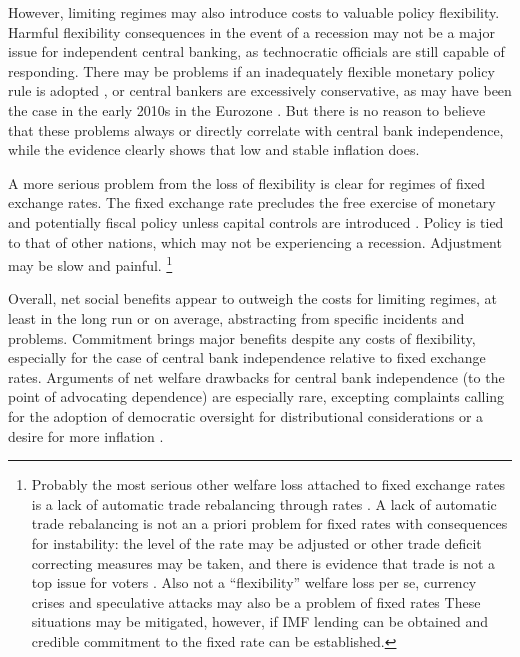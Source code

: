 \documentclass{article}
\begin{document}
    However, limiting regimes may also introduce costs to valuable policy flexibility. Harmful flexibility consequences in the event of a recession may not be a major issue for independent central banking, as technocratic officials are still capable of responding. There may be problems if an inadequately flexible monetary policy rule is adopted \citep{bernanke_taylor_2015}, or central bankers are excessively conservative, as may have been the case in the early 2010s in the Eurozone \citep{krugman_opinion_2011}. But there is no reason to believe that these problems always or directly correlate with central bank independence, while the evidence clearly shows that low and stable inflation does.
    
    A more serious problem from the loss of flexibility is clear for regimes of fixed exchange rates. The fixed exchange rate precludes the free exercise of monetary and potentially fiscal policy unless capital controls are introduced \citep{fleming_domestic_1962, mundell_capital_1963}. Policy is tied to that of other nations, which may not be experiencing a recession. Adjustment may be slow and painful. \footnote{Probably the most serious other welfare loss attached to fixed exchange rates is a lack of automatic trade rebalancing through rates \citep{friedman_essays_1953}. A lack of automatic trade rebalancing is not an a priori problem for fixed rates with consequences for instability: the level of the rate may be adjusted or other trade deficit correcting measures may be taken, and there is evidence that trade is not a top issue for voters \citep{guisinger_determining_2009}. Also not a “flexibility” welfare loss per se, currency crises and speculative attacks may also be a problem of fixed rates \citep{krugman_model_1979} These situations may be mitigated, however, if IMF lending can be obtained and credible commitment to the fixed rate can be established.}
    
    Overall, net social benefits appear to outweigh the costs for limiting regimes, at least in the long run or on average, abstracting from specific incidents and problems. Commitment brings major benefits despite any costs of flexibility, especially for the case of central bank independence relative to fixed exchange rates. Arguments of net welfare drawbacks for central bank independence (to the point of advocating dependence) are especially rare, excepting complaints calling for the adoption of democratic oversight for distributional considerations or a desire for more inflation \citep{fels_downside_2016}. 
    
\end{document}
